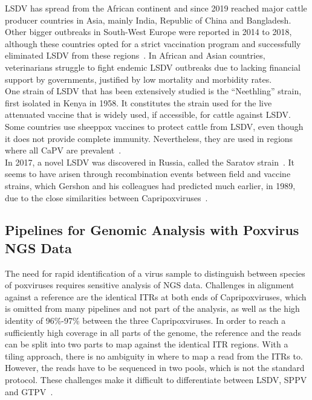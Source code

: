 \ac{LSDV} has spread from the African continent and since 2019 reached major cattle producer countries in Asia, mainly India, Republic of China and Bangladesh. Other bigger outbreaks in South-West Europe were reported in 2014 to 2018, although these countries opted for a strict vaccination program and successfully eliminated \ac{LSDV} from these regions~\cite{prevention2017control}. In African and Asian countries, veterinarians struggle to fight endemic \ac{LSDV} outbreaks due to lacking financial support by governments, justified by low mortality and morbidity rates. \\
One strain of \ac{LSDV} that has been extensively studied is the ``Neethling'' strain, first isolated in Kenya in 1958. It constitutes the strain used for the live attenuated vaccine that is widely used, if accessible, for cattle against \ac{LSDV}. Some countries use sheeppox vaccines to protect cattle from \ac{LSDV}, even though it does not provide complete immunity. Nevertheless, they are used in regions where all \acs{CaPV} are prevalent~\cite{brenner2009appearance}. \\
In 2017, a novel \ac{LSDV} was discovered in Russia, called the Saratov strain~\cite{sprygin2018analysis}. It seems to have arisen through recombination events between field and vaccine strains, which Gershon and his colleagues had predicted much earlier, in 1989, due to the close similarities between Capripoxviruses~\cite{gershon1989poxvirus}. 

\subsection{Pipelines for Genomic Analysis with Poxvirus NGS Data}\label{sec:2-pox-pipelines}
The need for rapid identification of a virus sample to distinguish between species of poxviruses requires sensitive analysis of \ac{NGS} data. Challenges in alignment against a reference are the identical \acp{ITR} at both ends of Capripoxviruses, which is omitted from many pipelines and not part of the analysis, as well as the high identity of 96\%-97\% between the three Capripoxviruses. In order to reach a sufficiently high coverage in all parts of the genome, the reference and the reads can be split into two parts to map against the identical \ac{ITR} regions. With a tiling approach, there is no ambiguity in where to map a read from the \acp{ITR} to. However, the reads have to be sequenced in two pools, which is not the standard protocol. These challenges make it difficult to differentiate between \ac{LSDV}, \ac{SPPV} and \ac{GTPV}~\cite{tulman2001genome}.

